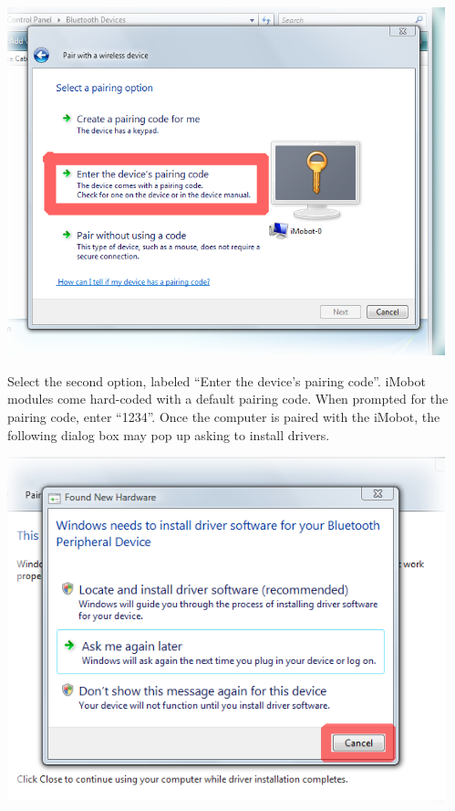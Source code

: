\documentclass{article}
\begin{document}
\begin{center}
\includegraphics[width=5in]{images/imobot_connect_3.png}
\end{center}

Select the second option, labeled ``Enter the device's pairing code''. iMobot
modules come hard-coded with a default pairing code. When prompted for the
pairing code, enter ``1234''. Once the computer is paired with the iMobot,
the following dialog box may pop up asking to install drivers.

\begin{center}
\includegraphics[width=5in]{images/imobot_connect_4.png}
\end{center}
\end{document}
